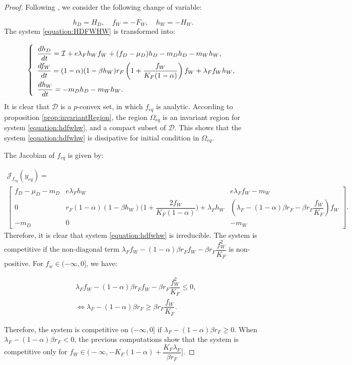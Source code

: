 \documentclass{article}
\newcommand{\lfw}{\lambda_{F}}
\newcommand{\lfw}{\lambda_{F}}
\newcommand{\cI}{\mathcal{I}}
\theoremstyle{definition}
\theoremstyle{remark}
\begin{document}
\begin{proof}
Following \cite{wang_predator-prey_1997}, we consider the following change of variable: 

\begin{equation}\label{equation:change of variable}
h_D =  H_D, \quad f_W = -F_W, \quad h_W = -H_W.
\end{equation} The system \eqref{equation:HDFWHW} is transformed into:

\begin{equation}
\def\arraystretch{2}
\left\{ \begin{array}{l}
\dfrac{dh_D}{dt}= \cI + e\lfw h_W f_W + (f_D - \mu_D) h_D - m_D h_D - m_W h_W, \\
\dfrac{df_W}{dt} = (1-\alpha)(1 - \beta h_W) r_F \left(1 + \dfrac{f_W}{K_F(1-\alpha)} \right) f_W + \lfw f_W h_W, \\
\dfrac{dh_W}{dt}= -m_D h_D - m_W h_W.
\end{array} \right.
\end{equation}
It is clear that $\mathcal{D}$ is a $p$-convex set, in which $f_{eq}$ is analytic. According to proposition \ref{prop:invariantRegion}, the region $\Omega_{eq}$ is an invariant region for system \eqref{equation:hdfwhw}, and a compact subset of $\mathcal{D}$. This shows that the system \eqref{equation:hdfwhw} is dissipative for initial condition in  $\Omega_{eq}$.

The Jacobian of $f_{eq}$ is given by:

{\footnotesize
\begin{multline}
\mathcal{J}_{f_{eq}}(y_{eq}) = \\ \begin{bmatrix}
f_D -\mu_D - m_D & e \lfw h_W & e \lfw f_W - m_W \\
0 & r_F (1-\alpha)(1-\beta h_W) \Big(1 + \dfrac{2 f_W}{K_F(1-\alpha)}\Big) + \lfw  h_W & \left(\lfw- (1-\alpha)\beta r_F - \beta r_F \dfrac{f_W}{K_F} \right)f_W\\
-m_D & 0 & -m_W
\end{bmatrix}.
\label{equation:jacobianMatrix compet}
\end{multline}}
Therefore, it is clear that system \eqref{equation:hdfwhw} is irreducible. The system is competitive if the non-diagonal term $\lfw f_W - (1-\alpha)\beta r_F f_W - \beta r_F \dfrac{f_W^2}{K_F}$ is non-positive. For $f_w \in (-\infty, 0]$, we have:

\begin{align*}
&\lfw f_W - (1-\alpha)\beta r_F f_W - \beta r_F \dfrac{f_W^2}{K_F} \leq 0, \\
&\Leftrightarrow \lfw - (1-\alpha)\beta r_F \geq \beta r_F \dfrac{f_W}{K_F}.
\end{align*}

Therefore, the system is competitive on $(-\infty, 0]$ if $\lfw - (1-\alpha)\beta r_F \geq 0$. When $\lfw - (1-\alpha)\beta r_F<0$, the previous computations show that the system is competitive only for $f_W \in \Big(-\infty, -K_F(1-\alpha) + \dfrac{K_F \lfw}{\beta r_F}\Big]$. 
\end{proof}
\end{document}
